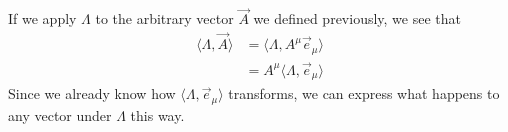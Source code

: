If we apply $\Lambda$ to the arbitrary vector $\vec{A}$ we defined previously, we see that 
\begin{align*}
    \langle \Lambda, \vec{A} \rangle &= \langle \Lambda, A^\mu \vec{e}_\mu \rangle \\
    &= A^\mu \langle \Lambda, \vec{e}_\mu \rangle
\end{align*}
Since we already know how $\langle \Lambda, \vec{e}_\mu \rangle$ transforms, we can express what happens to any vector under $\Lambda$ this way.
